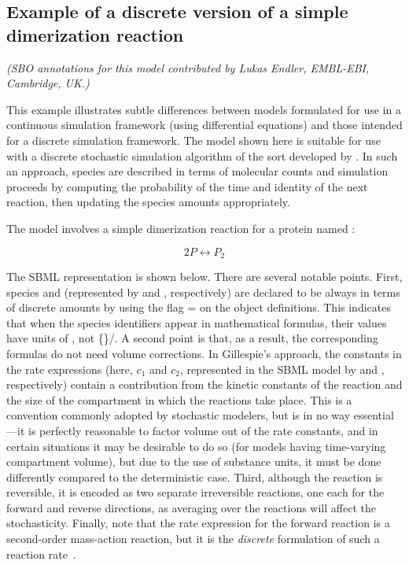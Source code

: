 
\subsection{Example of a discrete version of a simple dimerization reaction}
\label{sec:discrete-eg}

\emph{(SBO annotations for this model contributed by Lukas Endler,
  EMBL-EBI, Cambridge, UK.)}

This example illustrates subtle differences between models
formulated for use in a continuous simulation framework (\eg using
differential equations) and those intended for a discrete
simulation framework.  The model shown here is suitable for use
with a discrete stochastic simulation algorithm of the sort
developed by \cite{gillespie:1977}.  In such an approach, species
are described in terms of molecular counts and simulation
proceeds by computing the probability of the time and identity of
the next reaction, then updating the species amounts
appropriately.

The model involves a simple dimerization reaction for a protein
named :
\begin{linenomath}
\begin{equation*}
    2 P  \leftrightarrow  P_2
\end{equation*}
\end{linenomath}
The SBML representation is shown below.  There are several notable
points.  First, species  and  (represented
by  and , respectively) are declared to be always
in terms of discrete amounts by using the flag
= on the \Species object
definitions.  This indicates that when the species identifiers
appear in mathematical formulas, their values have units of
, not \{\}/.  A second point is that, as a result,
the corresponding \KineticLaw formulas do not need volume
corrections.  In Gillespie's approach, the constants in the rate
expressions (here, $c_1$ and $c_2$, represented in the SBML model
by  and , respectively) contain a contribution
from the kinetic constants of the reaction and the size of the
compartment in which the reactions take place.  This is a
convention commonly adopted by stochastic modelers, but is in no
way essential---it is perfectly reasonable to factor volume out of
the rate constants, and in certain situations it may be desirable
to do so (\eg for models having time-varying compartment volume),
but due to the use of substance units, it must be done differently
compared to the deterministic case.  Third, although the reaction
is reversible, it is encoded as two separate irreversible
reactions, one each for the forward and reverse directions, as
averaging over the reactions will affect the stochasticity.
Finally, note that the rate expression for the forward reaction is
a second-order mass-action reaction, but it is the \emph{discrete}
formulation of such a reaction rate~\citep{gillespie:1977}.


